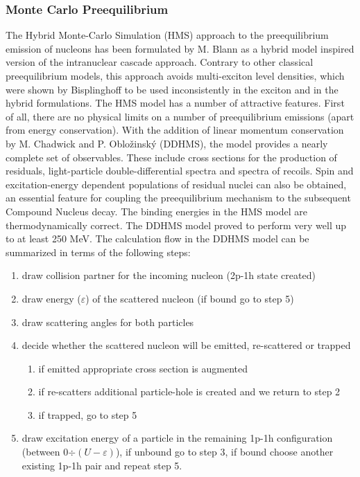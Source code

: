 \documentclass[twocolumn,amsmath,amssymb,10pt,groupedaddress,letter]{revtex4}
\begin{document}
\subsubsection{Monte Carlo Preequilibrium\label{DDHMS}}
The Hybrid Monte-Carlo Simulation (HMS) approach to the preequilibrium
emission of nucleons  has
been formulated by M. Blann \cite{Blann-HMS} as a hybrid model
\cite{hybrid,hybrid1,hybrid2,hybrid3}
inspired version of the intranuclear cascade approach. Contrary to
other classical preequilibrium models, this approach avoids multi-exciton
level densities, which were shown by Bisplinghoff
\cite{Bisplinghoff} to be used inconsistently in the exciton and
in the hybrid formulations. The HMS model has a number
of attractive features. First of all, there are no physical limits
on a number of preequilibrium emissions (apart from energy conservation).
With the addition of linear momentum conservation by M. Chadwick and
P. Oblo\v zinsk\' y (DDHMS), the model provides a nearly complete
set of observables. These include cross sections for the production
of residuals, light-particle double-differential spectra and spectra
of recoils. Spin and excitation-energy dependent populations of residual
nuclei can also be obtained, an essential feature for coupling the
preequilibrium mechanism to the subsequent Compound Nucleus decay.
The binding energies in the HMS model are thermodynamically
correct. The DDHMS model proved to perform very well
up to at least 250 MeV.
The calculation flow in the DDHMS model can be summarized in terms
of the following steps:
\begin{enumerate}
\item draw collision partner for the incoming nucleon (2p-1h state created)
\item draw energy ($\varepsilon$) of the scattered nucleon (if bound go
to step 5)
\item draw scattering angles for both particles
\item decide whether the scattered nucleon will be emitted, re-scattered
or trapped
\begin{enumerate}
\item if emitted appropriate cross section is augmented
\item if re-scatters additional particle-hole is created and we return to
step 2
\item if trapped, go to step 5
\end{enumerate}
\item draw excitation energy of a particle in the remaining 1p-1h configuration
(between 0$\div(U-\varepsilon)$), if unbound go to step 3, if bound
choose another existing 1p-1h pair and repeat step 5.
\end{enumerate}
\end{document}
